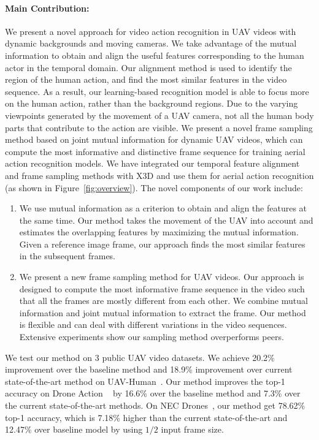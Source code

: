 \documentclass[10pt,twocolumn,letterpaper]{article}
\begin{document}
\paragraph{Main Contribution:}
We present a novel approach for video action recognition in UAV videos with dynamic backgrounds and moving cameras. 
We take advantage of the mutual information to obtain and align the useful features corresponding to the human actor in the temporal domain. Our alignment method is used to identify the region of the human action, and find the most similar features in the video sequence. As a result, our learning-based recognition model is able to focus more on the human action, rather than the background  regions. Due to the varying viewpoints generated by the movement of a UAV camera, not all the human body parts that contribute to the action are visible.  We present a  novel frame sampling method based on joint mutual information  for dynamic UAV videos, which can compute the most informative and distinctive frame sequence for training aerial action recognition models. We have integrated our temporal feature alignment and frame sampling methods with X3D\cite{feichtenhofer2020x3d} and use them for aerial action recognition (as shown in Figure~\ref{fig:overview}). The novel components of our work include: 
\begin{enumerate}
    \item We use mutual information as a criterion to obtain and align the features at the same time. Our method takes the movement of the UAV into account and estimates the overlapping features by maximizing the mutual information. Given a reference image frame, our approach finds the most similar features in the subsequent frames.
\item We present a new frame sampling method for UAV videos. Our approach is designed to compute the most informative frame sequence in the video such that all the frames are mostly different from each other. We combine mutual information and joint mutual information to extract the frame.
Our method is flexible and can deal with different variations in the video sequences. Extensive experiments show our sampling method overperforms peers.   \end{enumerate}
We test our method on 3 public UAV video datasets. We achieve 20.2\% improvement over the baseline method and  18.9\% improvement over current state-of-the-art method on UAV-Human~\cite{li2021uav}. Our method improves the top-1 accuracy on Drone Action ~\cite{perera2019drone} by 16.6\% over the baseline method and 7.3\% over the current state-of-the-art methods. On NEC Drones~\cite{choi2020unsupervised}, our method get 78.62\% top-1 accuracy, which is 7.18\% higher than the current state-of-the-art and 12.47\% over baseline model by using $1/2$ input frame size. 
\label{sec:intro}
\end{document}

